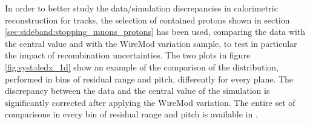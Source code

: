 In order to better study the data/simulation discrepancies in calorimetric reconstruction for tracks, the selection of contained protons shown in section \ref{sec:sideband:stopping_muons_protons} has been used, comparing the data with the central value and with the WireMod \dedx variation sample, to test in particular the impact of recombination uncertainties.
The two plots in figure \ref{fig:syst:dedx_1d} show an example of the comparison of the \dqdx distribution, performed in bins of residual range and pitch, differently for every plane.
The discrepancy between the data and the central value of the simulation is significantly corrected after applying the WireMod \dedx variation.
The entire set of comparisons in every bin of residual range and pitch is available in \cite{bib:pid_internal_note}.

